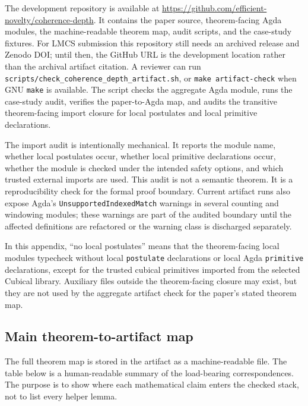 \documentclass{lmcs}
\begin{document}
The development repository is available at
\url{https://github.com/efficient-novelty/coherence-depth}.  It contains the paper source,
theorem-facing Agda modules, the machine-readable theorem map, audit scripts, and the
case-study fixtures.  For LMCS submission this repository still needs an archived release and
Zenodo DOI; until then, the GitHub URL is the development location rather than the archival
artifact citation.  A reviewer can run
\texttt{scripts/check\_coherence\_depth\_artifact.sh}, or \texttt{make artifact-check} when GNU
\texttt{make} is available.  The script checks the aggregate Agda module, runs the case-study
audit, verifies the paper-to-Agda map, and audits the transitive theorem-facing import closure
for local postulates and local primitive declarations.

The import audit is intentionally mechanical.  It reports the module name, whether local
postulates occur, whether local primitive declarations occur, whether the module is checked
under the intended safety options, and which trusted external imports are used.  This audit is
not a semantic theorem.  It is a reproducibility check for the formal proof boundary.
Current artifact runs also expose Agda's \texttt{UnsupportedIndexedMatch} warnings in several
counting and windowing modules; these warnings are part of the audited boundary until the
affected definitions are refactored or the warning class is discharged separately.

\begin{rem}
\label{rem:postulate-free-means}
In this appendix, ``no local postulates'' means that the theorem-facing local modules typecheck
without local \texttt{postulate} declarations or local Agda \texttt{primitive} declarations,
except for the trusted cubical primitives imported from the selected Cubical library.  Auxiliary
files outside the theorem-facing closure may exist, but they are not used by the aggregate
artifact check for the paper's stated theorem map.
\end{rem}

\subsection{Main theorem-to-artifact map}
\label{subsec:theorem-map}

The full theorem map is stored in the artifact as a machine-readable file.  The table below is a
human-readable summary of the load-bearing correspondences.  The purpose is to show where each
mathematical claim enters the checked stack, not to list every helper lemma.
\end{document}
